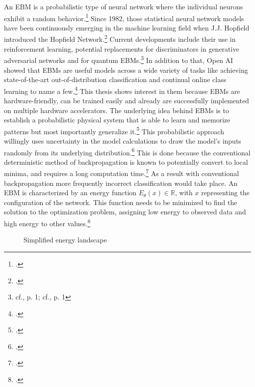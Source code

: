 An \ac{EBM} is a probabilistic type of neural network where the individual neurons exhibit a random behavior.\footcite[cf.][2]{huembeliPhysicsEnergybasedModels2022}
Since 1982, those statistical neural network models have been continuously emerging in the machine learning field when J.J. Hopfield introduced the Hopfield Network.\footcite[cf.][]{hopfieldNeuralNetworksPhysical1982}
Current developments include their use in reinforcement learning, potential replacements for discriminators in generative adversarial networks and for quantum \ac{EBM}s.\footnote{cf.\cite{verdonQuantumHamiltonianBasedModels2019}, p. 1; cf.\cite{duModelBasedPlanning2021}, p. 1}
In addition to that, Open AI showed that \ac{EBM}s are useful models across a wide variety of tasks like achieving state-of-the-art out-of-distribution classification and continual online class learning to name a few.\footcite[cf.][1-2]{duImplicitGenerationGeneralization2020}
This thesis shows interest in them because \ac{EBM}s are hardware-friendly, can be trained easily and already are successfully implemented on multiple hardware accelerators.
The underlying idea behind \ac{EBM}s is to establish a probabilistic physical system that is able to learn and memorize patterns but most importantly generalize it.\footcite[cf.][2]{huembeliPhysicsEnergybasedModels2022} 
This probabilistic approach willingly uses uncertainty in the model calculations to draw the model's inputs randomly from its underlying distribution.\footcite[cf.][25-27]{uusitaloOverviewMethodsEvaluate2015}
This is done because the conventional deterministic method of backpropagation is known to potentially convert to local minima, and requires a long computation time.\footcite[cf.][109]{spechtProbabilisticNeuralNetworks1990}
As a result with conventional backpropagation more frequently incorrect classification would take place.
An \ac{EBM} is characterized by an energy function \(E_{\theta}(x) \in \mathbb{R}\), with \( x \) representing the configuration of the network. This function needs to be minimized to find the solution to the optimization problem, assigning low energy to observed data and high energy to other values.\footcite[cf.][330]{gustafssonEnergyBasedModelsDeep2020}
\begin{figure}[H]
    \centering
    \caption{Simplified energy landscape}
    \label{energy_landscape_1}
\end{figure}
